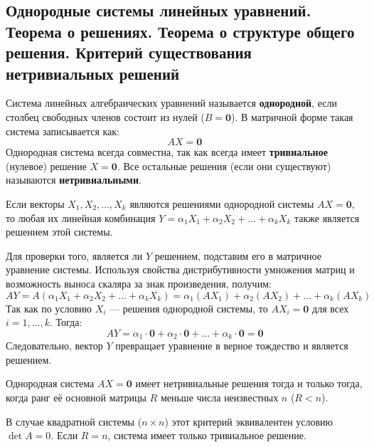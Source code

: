 \subsection{Однородные системы линейных уравнений. Теорема о решениях. Теорема о структуре общего решения. Критерий существования нетривиальных решений}

\begin{definition}
Система линейных алгебраических уравнений называется \textbf{однородной}, если столбец свободных членов состоит из нулей ($B = \mathbf{0}$). В матричной форме такая система записывается как:
\[ AX = \mathbf{0} \]
Однородная система всегда совместна, так как всегда имеет \textbf{тривиальное} (нулевое) решение $X = \mathbf{0}$. Все остальные решения (если они существуют) называются \textbf{нетривиальными}.
\end{definition}

\begin{theorem}
Если векторы $X_1, X_2, \dots, X_k$ являются решениями однородной системы $AX = \mathbf{0}$, то любая их линейная комбинация $Y = \alpha_1 X_1 + \alpha_2 X_2 + \dots + \alpha_k X_k$ также является решением этой системы.
\end{theorem}

\begin{tcolorbox}[title=Доказательство, breakable]
Для проверки того, является ли $Y$ решением, подставим его в матричное уравнение системы. Используя свойства дистрибутивности умножения матриц и возможность выноса скаляра за знак произведения, получим:
\[ AY = A(\alpha_1 X_1 + \alpha_2 X_2 + \dots + \alpha_k X_k) = \alpha_1 (AX_1) + \alpha_2 (AX_2) + \dots + \alpha_k (AX_k) \]
Так как по условию $X_i$ — решения однородной системы, то $AX_i = \mathbf{0}$ для всех $i = 1, \dots, k$. Тогда:
\[ AY = \alpha_1 \cdot \mathbf{0} + \alpha_2 \cdot \mathbf{0} + \dots + \alpha_k \cdot \mathbf{0} = \mathbf{0} \]
Следовательно, вектор $Y$ превращает уравнение в верное тождество и является решением.
\end{tcolorbox}

\begin{theorem}
Однородная система $AX = \mathbf{0}$ имеет нетривиальные решения тогда и только тогда, когда ранг её основной матрицы $R$ меньше числа неизвестных $n$ ($R < n$).
\end{theorem}

В случае квадратной системы ($n \times n$) этот критерий эквивалентен условию $\det A = 0$. Если $R = n$, система имеет только тривиальное решение.


